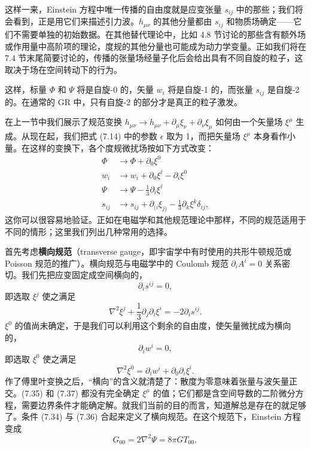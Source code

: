 这样一来，Einstein 方程中唯一传播的自由度就是应变张量 $s_{ij}$ 中的那些；我们将会看到，正是用它们来描述引力波。$h_{\mu\nu}$ 的其他分量都由 $s_{ij}$ 和物质场确定——它们不需要单独的初始数据。在其他替代理论中，比如 4.8 节讨论的那些含有额外场或作用量中高阶项的理论，度规的其他分量也可能成为动力学变量。正如我们将在 7.4 节末尾简要讨论的，传播的张量场经量子化后会给出具有不同自旋的粒子，这取决于场在空间转动下的行为。

这样，标量 $\Phi$ 和 $\Psi$ 将是自旋-0 的，矢量 $w_{i}$ 将是自旋-1 的，而张量 $s_{ij}$ 是自旋-2 的。在通常的 GR 中，只有自旋-2 的部分才是真正的粒子激发。

在上一节中我们展示了规范变换 $h_{\mu\nu} \to h_{\mu\nu} + \partial_{\mu}\xi_{\nu} + \partial_{\nu}\xi_{\mu}$ 如何由一个矢量场 $\xi^{\mu}$ 生成。从现在起，我们把式 (7.14) 中的参数 $\epsilon$ 取为 1，而把矢量场 $\xi^{\mu}$ 本身看作小量。在这样的变换下，各个度规微扰场按如下方式改变：
\begin{align*}
\Phi &\to \Phi + \partial_{0}\xi^{0} \\
w_{i} &\to w_{i} + \partial_{0}\xi^{i} - \partial_{i}\xi^{0} \\
\Psi &\to \Psi - \frac{1}{3}\partial_{i}\xi^{i} \\
s_{ij} &\to s_{ij} + \partial_{(i}\xi_{j)} - \frac{1}{3}\partial_{k}\xi^{k}\delta_{ij},
\tag{7.33}
\end{align*}
这你可以很容易地验证。正如在电磁学和其他规范理论中那样，不同的规范适用于不同的情形；这里我们列出几种常用的选择。

首先考虑\textbf{横向规范}（transverse gauge，即宇宙学中有时使用的共形牛顿规范或 Poisson 规范的推广）。横向规范与电磁学中的 Coulomb 规范 $\partial_{i}A^{i} = 0$ 关系密切。我们先把应变固定成空间横向的，
\begin{equation*}
\partial_{i}s^{ij} = 0,
\tag{7.34}
\end{equation*}
即选取 $\xi^{j}$ 使之满足
\begin{equation*}
\nabla^{2}\xi^{j} + \frac{1}{3}\partial_{j}\partial_{i}\xi^{i} = -2\partial_{i}s^{ij}.
\tag{7.35}
\end{equation*}
$\xi^{0}$ 的值尚未确定，于是我们可以利用这个剩余的自由度，使矢量微扰成为横向的，
\begin{equation*}
\partial_{i}w^{i} = 0,
\tag{7.36}
\end{equation*}
即选取 $\xi^{0}$ 使之满足
\begin{equation*}
\nabla^{2}\xi^{0} = \partial_{i}w^{i} + \partial_{0}\partial_{i}\xi^{i}.
\tag{7.37}
\end{equation*}
作了傅里叶变换之后，“横向”的含义就清楚了：散度为零意味着张量与波矢量正交。(7.35) 和 (7.37) 都没有完全确定 $\xi^{\mu}$ 的值；它们都是含空间导数的二阶微分方程，需要边界条件才能确定解。就我们当前的目的而言，知道解总是存在的就足够了。条件 (7.34) 与 (7.36) 合起来定义了横向规范。在这个规范下，Einstein 方程变成
\begin{equation*}
\boxed{\,G_{00} = 2\nabla^{2}\Psi = 8\pi GT_{00},\,}
\tag{7.38}
\end{equation*}


